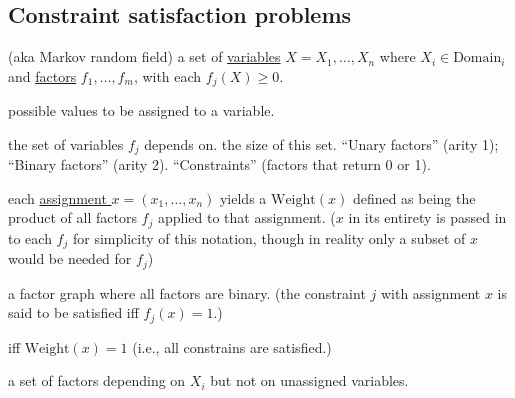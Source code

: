 \subsection{Constraint satisfaction problems}

 (aka Markov random field) a set of \underline{variables} $X
= {X_1,\dots,X_n}$ where $X_i \in \text{Domain}_i$ and \underline{factors}
$f_1,\dots,f_m$, with each $f_j(X) \ge 0$.

 possible values to be assigned to a variable.

 the set of variables $f_j$ depends on.
 the size of this set. ``Unary factors'' (arity 1); ``Binary
factors'' (arity 2). ``Constraints'' (factors that return 0 or 1).

 each \underline{assignment $x = (x_1, \dots, x_n)$}
yields a $\text{Weight}(x)$ defined as being the product of all factors $f_j$
applied to that assignment.
 ($x$ in its entirety is passed
in to each $f_j$ for simplicity of this notation, though in reality only a
subset of $x$ would be needed for $f_j$)

 a factor graph where all factors are binary.
 (the constraint $j$ with
assignment $x$ is said to be satisfied iff $f_j(x) = 1$.)

 iff $\text{Weight}(x) = 1$ (i.e., all
constrains are satisfied.)

 a set of factors depending on $X_i$ but not
on unassigned variables.

